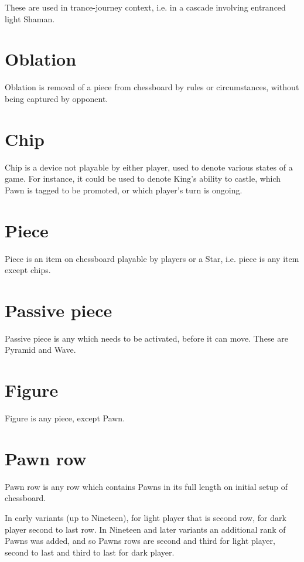 These are used in trance-journey context, i.e. in a cascade involving entranced light Shaman.

\section*{Oblation}
\label{sec:Terms/Oblation}
Oblation is removal of a piece from chessboard by rules or circumstances,
without being captured by opponent.

\section*{Chip}
\label{sec:Terms/Chip}
Chip is a device not playable by either player, used to denote various states
of a game. For instance, it could be used to denote King's ability to castle,
which Pawn is tagged to be promoted, or which player's turn is ongoing.

\section*{Piece}
\label{sec:Terms/Piece}
Piece is an item on chessboard playable by players or a Star, i.e. piece is
any item except chips.

\section*{Passive piece}
\label{sec:Terms/Passive piece}
Passive piece is any which needs to be activated, before it can move.
These are Pyramid and Wave.

\section*{Figure}
\label{sec:Terms/Figure}
Figure is any piece, except Pawn.

\section*{Pawn row}
\label{sec:Terms/Pawn row}
Pawn row is any row which contains Pawns in its full length on initial setup
of chessboard.

In early variants (up to Nineteen), for light player that is second row, for
dark player second to last row. In Nineteen and later variants an additional
rank of Pawns was added, and so Pawns rows are second and third for light
player, second to last and third to last for dark player.

